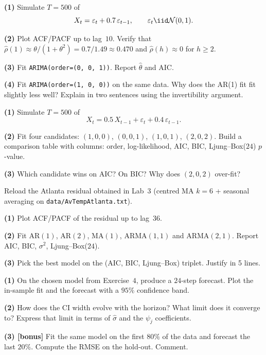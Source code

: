 \documentclass[a4paper,11pt]{article}
\begin{document}
\begin{exercise}[MA$(1)$ identification]
\textbf{(1)} Simulate $T = 500$ of
\[
  X_t = \varepsilon_t + 0.7\, \varepsilon_{t-1},
  \qquad \varepsilon_t \iid \mathcal N(0, 1).
\]

\textbf{(2)} Plot ACF/PACF up to lag~$10$. Verify that
$\widehat\rho(1) \approx \theta / (1 + \theta^2) = 0.7 / 1.49
\approx 0.470$ and $\widehat\rho(h) \approx 0$ for $h \geq 2$.

\textbf{(3)} Fit \texttt{ARIMA(order=(0, 0, 1))}. Report
$\widehat\theta$ and AIC.

\textbf{(4)} Fit \texttt{ARIMA(order=(1, 0, 0))} on the same data.
Why does the AR(1) fit fit slightly less well? Explain in two
sentences using the invertibility argument.
\end{exercise}

\begin{exercise}
\textbf{(1)} Simulate $T = 500$ of
\[
  X_t = 0.5\, X_{t-1} + \varepsilon_t + 0.4\, \varepsilon_{t-1}.
\]

\textbf{(2)} Fit four candidates:
$(1, 0, 0)$, $(0, 0, 1)$, $(1, 0, 1)$, $(2, 0, 2)$.
Build a comparison table with columns: order, log-likelihood, AIC,
BIC, Ljung--Box($24$) $p$-value.

\textbf{(3)} Which candidate wins on AIC? On BIC? Why does
$(2, 0, 2)$ over-fit?
\end{exercise}

\begin{exercise}
Reload the Atlanta residual obtained in Lab~3 (centred MA $k = 6$ +
seasonal averaging on \texttt{data/AvTempAtlanta.txt}).

\textbf{(1)} Plot ACF/PACF of the residual up to lag~$36$.

\textbf{(2)} Fit AR$(1)$, AR$(2)$, MA$(1)$, ARMA$(1, 1)$ and
ARMA$(2, 1)$. Report AIC, BIC, $\sigma^2$, Ljung--Box($24$).

\textbf{(3)} Pick the best model on the (AIC, BIC, Ljung--Box)
triplet. Justify in 5 lines.
\end{exercise}

\begin{exercise}
\textbf{(1)} On the chosen model from Exercise~$4$, produce a
$24$-step forecast. Plot the in-sample fit and the forecast with a
$95\%$ confidence band.

\textbf{(2)} How does the CI width evolve with the horizon? What
limit does it converge to? Express that limit in terms of
$\widehat\sigma$ and the $\psi_j$ coefficients.

\textbf{(3) [bonus]} Fit the same model on the first $80\%$ of the
data and forecast the last $20\%$. Compute the RMSE on the
hold-out. Comment.
\end{exercise}
\end{document}
